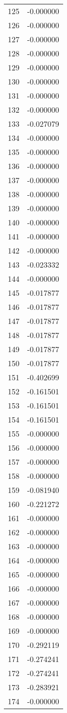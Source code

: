 \documentclass[12pt]{article}
\begin{document}
\begin{longtable}{@{}cc@{}}
125 & -0.000000 \\
126 & -0.000000 \\
127 & -0.000000 \\
128 & -0.000000 \\
129 & -0.000000 \\
130 & -0.000000 \\
131 & -0.000000 \\
132 & -0.000000 \\
133 & -0.027079 \\
134 & -0.000000 \\
135 & -0.000000 \\
136 & -0.000000 \\
137 & -0.000000 \\
138 & -0.000000 \\
139 & -0.000000 \\
140 & -0.000000 \\
141 & -0.000000 \\
142 & -0.000000 \\
143 & -0.023332 \\
144 & -0.000000 \\
145 & -0.017877 \\
146 & -0.017877 \\
147 & -0.017877 \\
148 & -0.017877 \\
149 & -0.017877 \\
150 & -0.017877 \\
151 & -0.402699 \\
152 & -0.161501 \\
153 & -0.161501 \\
154 & -0.161501 \\
155 & -0.000000 \\
156 & -0.000000 \\
157 & -0.000000 \\
158 & -0.000000 \\
159 & -0.081940 \\
160 & -0.221272 \\
161 & -0.000000 \\
162 & -0.000000 \\
163 & -0.000000 \\
164 & -0.000000 \\
165 & -0.000000 \\
166 & -0.000000 \\
167 & -0.000000 \\
168 & -0.000000 \\
169 & -0.000000 \\
170 & -0.292119 \\
171 & -0.274241 \\
172 & -0.274241 \\
173 & -0.283921 \\
174 & -0.000000 \\

\end{longtable}
\end{document}
